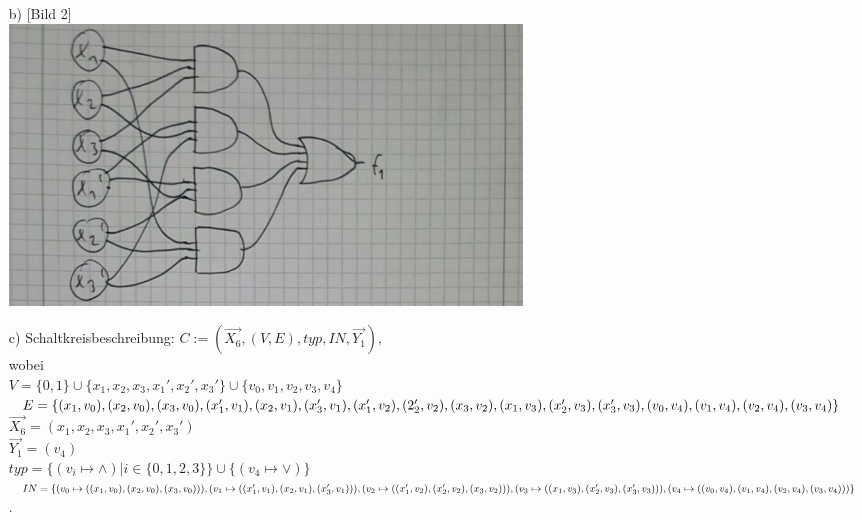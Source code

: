\documentclass{scrartcl}
\begin{document}
\begin{itemize}
		\item[b)]
		[Bild 2]\\
		\includegraphics[width=13.6cm]{bild2.jpg}
		\item[c)] Schaltkreisbeschreibung:
		$ C := (\overrightarrow{X_{6}}, (V,E), typ, IN, \overrightarrow{Y_{1}}), $\\
		wobei\\
		$ V = \{0,1\} \cup \{x_{1}, x_{2}, x_{3}, x_{1}', x_{2}', x_{3}'\} \cup \{v_{0}, v_{1}, v_{2}, v_{3}, v_{4}\} $\\
		$ E = \{(x_{1},v_{0}), (x_{2},v_{0}), (x_{3},v_{0}),
		(x_{1}',v_{1}), (x_{2},v_{1}), (x_{3}',v_{1}),
		(x_{1}',v_{2}), (2_{2}',v_{2}), (x_{3},v_{2}),
		(x_{1},v_{3}), (x_{2}',v_{3}),\\ (x_{3}',v_{3}),
		(v_{0},v_{4}), (v_{1},v_{4}), (v_{2},v_{4}), (v_{3},v_{4})\} $ \\
		$ \overrightarrow{X_{6}} = (x_{1}, x_{2}, x_{3}, x_{1}', x_{2}', x_{3}') $ \\
		$ \overrightarrow{Y_{1}} = (v_{4}) $ \\
		$ typ = \{(v_{i} \mapsto \wedge) | i \in \{0,1,2,3\}\} \cup \{(v_{4} \mapsto \vee)\}$ \\
		$ IN = \{(v_{0} \mapsto ((x_{1}, v_{0}),(x_{2}, v_{0}),(x_{3}, v_{0}))), (v_{1} \mapsto ((x_{1}', v_{1}), (x_{2}, v_{1}), (x_{3}', v_{1}))), \\(v_{2} \mapsto ((x_{1}', v_{2}),(x_{2}', v_{2}),(x_{3}, v_{2}))), (v_{3} \mapsto ((x_{1}, v_{3}),(x_{2}', v_{3}),(x_{3}', v_{3}))), \\(v_{4} \mapsto ((v_{0}, v_{4}),(v_{1}, v_{4}),(v_{2}, v_{4}),(v_{3}, v_{4})))\} $.

	\end{itemize}
\end{document}
